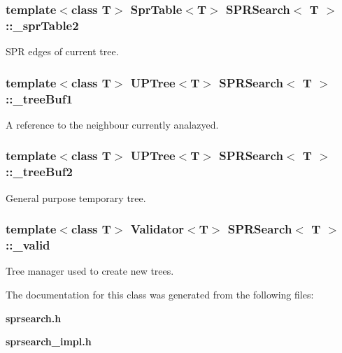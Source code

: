 \subsubsection{\setlength{\rightskip}{0pt plus 5cm}template$<$class T$>$ {\bf Spr\-Table}$<$T$>$ {\bf SPRSearch}$<$ T $>$::{\bf \_\-spr\-Table2}\hspace{0.3cm}{\tt  [protected]}}\label{classSPRSearch_p16}


SPR edges of current tree. 

\subsubsection{\setlength{\rightskip}{0pt plus 5cm}template$<$class T$>$ {\bf UPTree}$<$T$>$ {\bf SPRSearch}$<$ T $>$::{\bf \_\-tree\-Buf1}\hspace{0.3cm}{\tt  [protected]}}\label{classSPRSearch_p9}


A reference to the neighbour currently analazyed. 

\subsubsection{\setlength{\rightskip}{0pt plus 5cm}template$<$class T$>$ {\bf UPTree}$<$T$>$ {\bf SPRSearch}$<$ T $>$::{\bf \_\-tree\-Buf2}\hspace{0.3cm}{\tt  [protected]}}\label{classSPRSearch_p10}


General purpose temporary tree. 

\subsubsection{\setlength{\rightskip}{0pt plus 5cm}template$<$class T$>$ {\bf Validator}$<$T$>$ {\bf SPRSearch}$<$ T $>$::{\bf \_\-valid}\hspace{0.3cm}{\tt  [protected]}}\label{classSPRSearch_p5}


Tree manager used to create new trees. 



The documentation for this class was generated from the following files:\begin{CompactItemize}
\item 
{\bf sprsearch.h}\item 
{\bf sprsearch\_\-impl.h}\end{CompactItemize}
